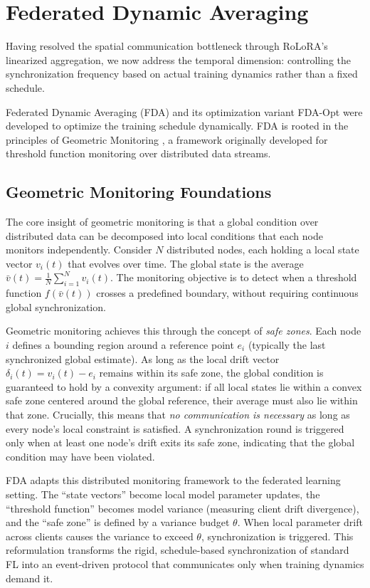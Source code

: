 \section{Federated Dynamic Averaging}
\label{sec:fda}
Having resolved the spatial communication bottleneck through RoLoRA's linearized aggregation, we now address the temporal dimension: controlling the synchronization frequency based on actual training dynamics rather than a fixed schedule.

Federated Dynamic Averaging (FDA) \cite{theologitis2025communication} and its optimization variant FDA-Opt \cite{theologitis2025fda} were developed to optimize the training schedule dynamically. FDA is rooted in the principles of Geometric Monitoring \cite{sharfman2006geometric}, a framework originally developed for threshold function monitoring over distributed data streams.

\subsection{Geometric Monitoring Foundations}
The core insight of geometric monitoring is that a global condition over distributed data can be decomposed into local conditions that each node monitors independently. Consider $N$ distributed nodes, each holding a local state vector $v_i(t)$ that evolves over time. The global state is the average $\bar{v}(t) = \frac{1}{N}\sum_{i=1}^{N} v_i(t)$. The monitoring objective is to detect when a threshold function $f(\bar{v}(t))$ crosses a predefined boundary, without requiring continuous global synchronization.

Geometric monitoring achieves this through the concept of \emph{safe zones}. Each node $i$ defines a bounding region around a reference point $e_i$ (typically the last synchronized global estimate). As long as the local drift vector $\delta_i(t) = v_i(t) - e_i$ remains within its safe zone, the global condition is guaranteed to hold by a convexity argument: if all local states lie within a convex safe zone centered around the global reference, their average must also lie within that zone. Crucially, this means that \emph{no communication is necessary} as long as every node's local constraint is satisfied. A synchronization round is triggered only when at least one node's drift exits its safe zone, indicating that the global condition may have been violated.

FDA adapts this distributed monitoring framework to the federated learning setting. The ``state vectors'' become local model parameter updates, the ``threshold function'' becomes model variance (measuring client drift divergence), and the ``safe zone'' is defined by a variance budget $\theta$. When local parameter drift across clients causes the variance to exceed $\theta$, synchronization is triggered. This reformulation transforms the rigid, schedule-based synchronization of standard FL into an event-driven protocol that communicates only when training dynamics demand it.

